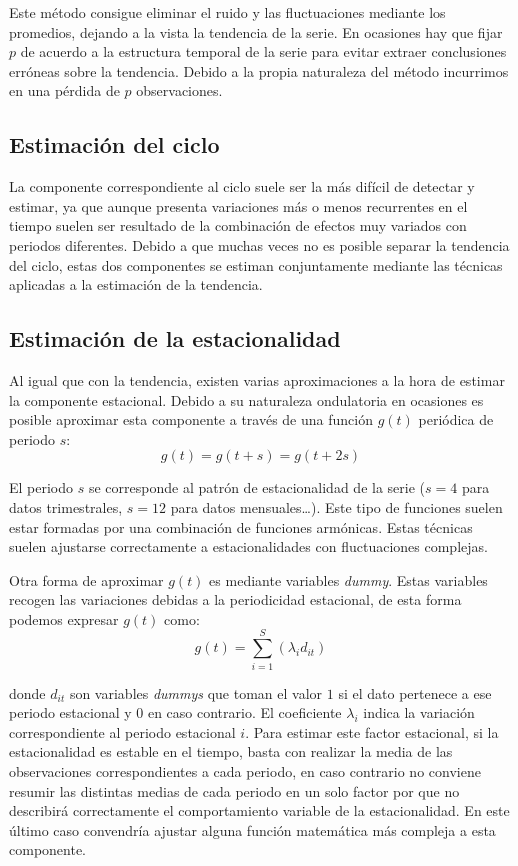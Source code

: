 Este método consigue eliminar el ruido y las fluctuaciones mediante los promedios, dejando a la vista la tendencia de la serie. En ocasiones hay que fijar $p$ de acuerdo a la estructura temporal de la serie para evitar extraer conclusiones erróneas sobre la tendencia.  Debido a la propia naturaleza del método incurrimos en una pérdida de $p$ observaciones.

\subsection{Estimación del ciclo}
La componente correspondiente al ciclo suele ser la más difícil de detectar y estimar, ya que aunque presenta variaciones más o menos recurrentes en el tiempo suelen ser resultado de la combinación de efectos muy variados con periodos diferentes. Debido a que muchas veces no es posible separar la tendencia del ciclo, estas dos componentes se estiman conjuntamente mediante las técnicas aplicadas a la estimación de la tendencia.

\subsection{Estimación de la estacionalidad}
Al igual que con la tendencia, existen varias aproximaciones a la hora de estimar la componente estacional. Debido a su naturaleza ondulatoria en ocasiones es posible aproximar esta componente a través de una función $g(t)$ periódica de periodo $s$:
\begin{equation}
    g(t) = g(t + s) = g(t + 2s)
\end{equation}

El periodo $s$ se corresponde al patrón de estacionalidad de la serie ($s = 4$ para datos trimestrales, $s = 12$ para datos mensuales…). Este tipo de funciones suelen estar formadas por una combinación de funciones armónicas. Estas técnicas suelen ajustarse  correctamente a estacionalidades con fluctuaciones complejas.

Otra forma de aproximar $g(t)$ es mediante variables \textit{dummy}. Estas variables recogen las variaciones debidas a la periodicidad estacional, de esta forma podemos expresar $g(t)$ como:
\begin{equation}
    g(t) = \sum_{i=1}^{S}(\lambda_{i} d_{it})
\end{equation}

\noindent donde $d_{it}$ son variables \textit{dummys} que toman el valor $1$ si el dato pertenece a ese periodo estacional y $0$ en caso contrario. El coeficiente $\lambda_{i}$ indica la variación correspondiente al periodo estacional $i$. Para estimar este factor estacional, si la estacionalidad es estable en el tiempo, basta con realizar la media de las observaciones correspondientes a cada periodo, en caso contrario no conviene resumir las distintas medias de cada periodo en un solo factor por que no describirá correctamente el comportamiento variable de la estacionalidad. En este último caso convendría ajustar alguna función matemática más compleja a esta componente.

